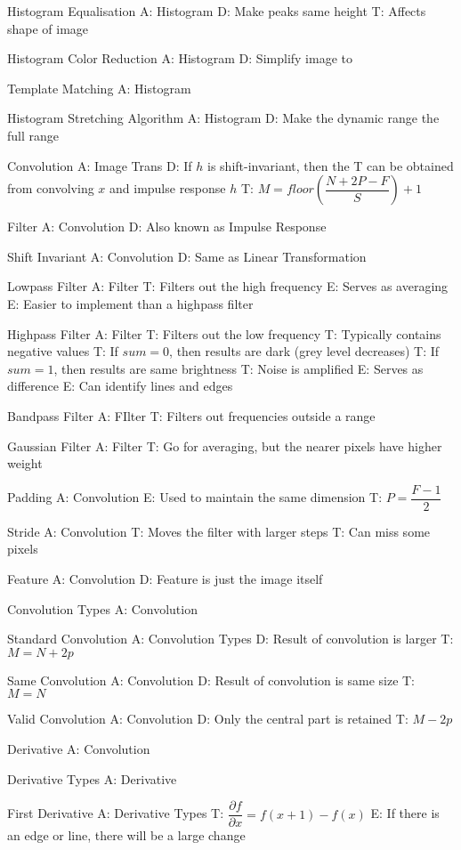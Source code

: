 \documentclass{article}
\begin{document}
Histogram Equalisation
A: Histogram
D: Make peaks same height
T: Affects shape of image

Histogram Color Reduction
A: Histogram
D: Simplify image to

Template Matching
A: Histogram

Histogram Stretching Algorithm
A: Histogram
D: Make the dynamic range the full range

Convolution
A: Image Trans
D: If $h$ is shift-invariant, then the T can be obtained from convolving $x$ and impulse response $h$
T: $M = floor(\dfrac{N + 2P - F}{S}) + 1$

Filter
A: Convolution
D: Also known as Impulse Response

Shift Invariant
A: Convolution
D: Same as Linear Transformation

Lowpass Filter
A: Filter
T: Filters out the high frequency
E: Serves as averaging
E: Easier to implement than a highpass filter

Highpass Filter
A: Filter
T: Filters out the low frequency
T: Typically contains negative values
T: If $sum = 0$, then results are dark (grey level decreases)
T: If $sum = 1$, then results are same brightness
T: Noise is amplified
E: Serves as difference
E: Can identify lines and edges

Bandpass Filter
A: FIlter
T: Filters out frequencies outside a range

Gaussian Filter
A: Filter
T: Go for averaging, but the nearer pixels have higher weight

Padding
A: Convolution
E: Used to maintain the same dimension
T: $P = \dfrac{F-1}{2}$

Stride
A: Convolution
T: Moves the filter with larger steps
T: Can miss some pixels

Feature
A: Convolution
D: Feature is just the image itself

Convolution Types
A: Convolution

Standard Convolution
A: Convolution Types
D: Result of convolution is larger
T: $M = N + 2p$

Same Convolution
A: Convolution
D: Result of convolution is same size
T: $M = N$

Valid Convolution
A: Convolution
D: Only the central part is retained
T: $M - 2p$

Derivative
A: Convolution

Derivative Types
A: Derivative

First Derivative
A: Derivative Types
T: $\dfrac{\partial f}{\partial x} = f(x+1) - f(x)$
E: If there is an edge or line, there will be a large change
\end{document}
